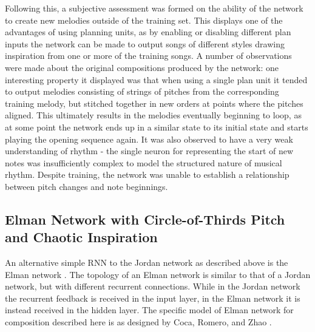 \documentclass[ author={Stephen Livermore-Tozer},
				supervisor={Dr. Peter Flach},
				degree={MEng},
				title={Performing Algorithmic Co-composition Using Machine Learning},
				subtitle={},
				type={research},
				year={2016} ]{dissertation}
\begin{document}
	Following this, a subjective assessment was formed on the ability of the network to create new melodies outside of the training set. This displays one of the advantages of using planning units, as by enabling or disabling different plan inputs the network can be made to output songs of different styles drawing inspiration from one or more of the training songs. A number of observations were made about the original compositions produced by the network: one interesting property it displayed was that when using a single plan unit it tended to output melodies consisting of strings of pitches from the corresponding training melody, but stitched together in new orders at points where the pitches aligned. This ultimately results in the melodies eventually beginning to loop, as at some point the network ends up in a similar state to its initial state and starts playing the opening sequence again. It was also observed to have a very weak understanding of rhythm - the single neuron for representing the start of new notes was insufficiently complex to model the structured nature of musical rhythm. Despite training, the network was unable to establish a relationship between pitch changes and note beginnings.
	
	\subsection{Elman Network with Circle-of-Thirds Pitch and Chaotic Inspiration}
	\label{sec:coca-net}
	
	An alternative simple RNN to the Jordan network as described above is the Elman network \cite{elman1990finding}. The topology of an Elman network is similar to that of a Jordan network, but with different recurrent connections. While in the Jordan network the recurrent feedback is received in the input layer, in the Elman network it is instead received in the hidden layer. The specific model of Elman network for composition described here is as designed by Coca, Romero, and Zhao \cite{coca2011generation}.
	
\end{document}
